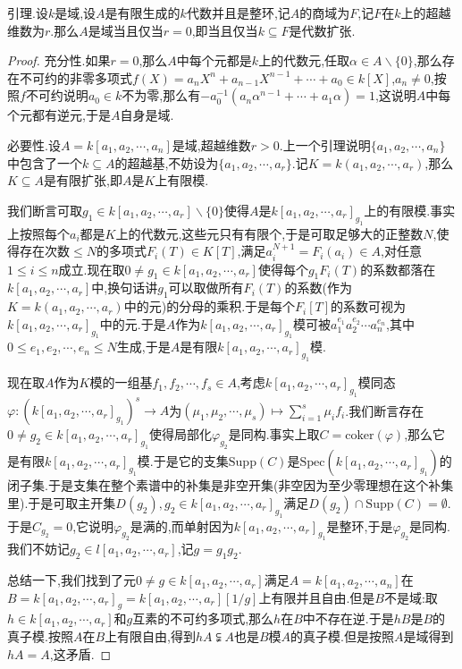 引理.设$k$是域,设$A$是有限生成的$k$代数并且是整环,记$A$的商域为$F$,记$F$在$k$上的超越维数为$r$.那么$A$是域当且仅当$r=0$,即当且仅当$k\subseteq F$是代数扩张.
\begin{proof}
	
	充分性.如果$r=0$,那么$A$中每个元都是$k$上的代数元,任取$\alpha\in A\backslash\{0\}$,那么存在不可约的非零多项式$f(X)=a_nX^n+a_{n-1}X^{n-1}+\cdots+a_0\in k[X]$,$a_n\not=0$,按照$f$不可约说明$a_0\in k$不为零,那么有$-a_0^{-1}(a_n\alpha^{n-1}+\cdots+a_1\alpha)=1$,这说明$A$中每个元都有逆元,于是$A$自身是域.
	
	必要性.设$A=k[a_1,a_2,\cdots,a_n]$是域,超越维数$r>0$.上一个引理说明$\{a_1,a_2,\cdots,a_n\}$中包含了一个$k\subseteq A$的超越基,不妨设为$\{a_1,a_2,\cdots,a_r\}$.记$K=k(a_1,a_2,\cdots,a_r)$,那么$K\subseteq A$是有限扩张,即$A$是$K$上有限模.
	
	我们断言可取$g_1\in k[a_1,a_2,\cdots,a_r]\backslash\{0\}$使得$A$是$k[a_1,a_2,\cdots,a_r]_{g_1}$上的有限模.事实上按照每个$a_i$都是$K$上的代数元,这些元只有有限个,于是可取足够大的正整数$N$,使得存在次数$\le N$的多项式$F_i(T)\in K[T]$,满足$a_i^{N+1}=F_i(a_i)\in A$,对任意$1\le i\le n$成立.现在取$0\not=g_1\in k[a_1,a_2,\cdots,a_r]$使得每个$g_1F_i(T)$的系数都落在$k[a_1,a_2,\cdots,a_r]$中,换句话讲$g_1$可以取做所有$F_i(T)$的系数(作为$K=k(a_1,a_2,\cdots,a_r)$中的元)的分母的乘积.于是每个$F_i[T]$的系数可视为$k[a_1,a_2,\cdots,a_r]_{g_1}$中的元.于是$A$作为$k[a_1,a_2,\cdots,a_r]_{g_1}$模可被$a_1^{e_1}a_2^{e_2}\cdots a_n^{e_n}$,其中$0\le e_1,e_2,\cdots,e_n\le N$生成,于是$A$是有限$k[a_1,a_2,\cdots,a_r]_{g_1}$模.
	
	现在取$A$作为$K$模的一组基$f_1,f_2,\cdots,f_s\in A$,考虑$k[a_1,a_2,\cdots,a_r]_{g_1}$模同态$\varphi:(k[a_1,a_2,\cdots,a_r]_{g_1})^s\to A$为$(\mu_1,\mu_2,\cdots,\mu_s)\mapsto\sum_{i=1}^s\mu_if_i$.我们断言存在$0\not=g_2\in k[a_1,a_2,\cdots,a_r]_{g_1}$使得局部化$\varphi_{g_2}$是同构.事实上取$C=\mathrm{coker}(\varphi)$,那么它是有限$k[a_1,a_2,\cdots,a_r]_{g_1}$模.于是它的支集$\mathrm{Supp}(C)$是$\mathrm{Spec}(k[a_1,a_2,\cdots,a_r]_{g_1})$的闭子集.于是支集在整个素谱中的补集是非空开集(非空因为至少零理想在这个补集里).于是可取主开集$D(g_2),g_2\in k[a_1,a_2,\cdots,a_r]_{g_1}$满足$D(g_2)\cap\mathrm{Supp}(C)=\emptyset$.于是$C_{g_2}=0$,它说明$\varphi_{g_2}$是满的,而单射因为$k[a_1,a_2,\cdots,a_r]_{g_1}$是整环,于是$\varphi_{g_2}$是同构.我们不妨记$g_2\in l[a_1,a_2,\cdots,a_r]$,记$g=g_1g_2$.
	
	总结一下,我们找到了元$0\not=g\in k[a_1,a_2,\cdots,a_r]$满足$A=k[a_1,a_2,\cdots,a_n]$在$B=k[a_1,a_2,\cdots,a_r]_{g}=k[a_1,a_2,\cdots,a_r][1/g]$上有限并且自由.但是$B$不是域:取$h\in k[a_1,a_2,\cdots,a_r]$和$g$互素的不可约多项式,那么$h$在$B$中不存在逆.于是$hB$是$B$的真子模.按照$A$在$B$上有限自由,得到$hA\subsetneqq A$也是$B$模$A$的真子模.但是按照$A$是域得到$hA=A$,这矛盾.
\end{proof}

